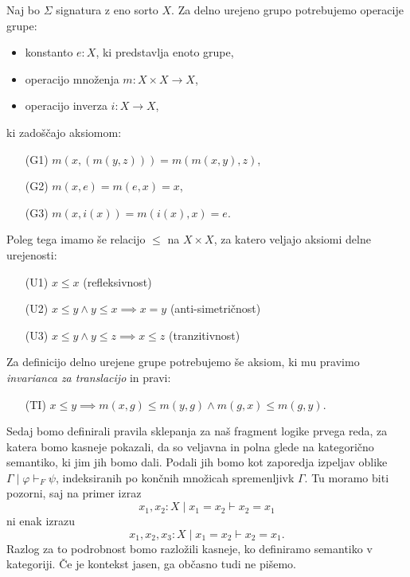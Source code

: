 \documentclass[../kategoricna_logika.tex]{subfiles}
\begin{document}
\begin{primer}\label{primer:delno-urejene-grupe}
  Naj bo $\Sigma$ signatura z eno sorto $X$. Za delno
  urejeno grupo potrebujemo operacije grupe:
  \begin{itemize}
  \item konstanto $e : X$, ki predstavlja enoto grupe,
  \item operacijo množenja $m : X \times X \to X$,
  \item operacijo inverza $i : X \to X$,
  \end{itemize}
  ki zadoščajo aksiomom:
  \begin{itemize}
  \item[(G1)] $m(x,(m(y,z))) = m(m(x,y), z)$,
  \item[(G2)] $m(x,e) = m(e,x) = x$,
  \item[(G3)] $m(x,i(x)) = m(i(x), x) = e$.
  \end{itemize}
  Poleg tega imamo še relacijo $\leq$ na $X \times X$, za katero
  veljajo aksiomi delne urejenosti:
  \begin{itemize}
  \item[(U1)] $x \leq x$ (refleksivnost)
  \item[(U2)] $x \leq y \wedge y \leq x \implies x = y$
    (anti-simetričnost)
  \item[(U3)] $x \leq y \wedge y \leq z \implies x \leq z$
    (tranzitivnost)
  \end{itemize}
  Za definicijo delno urejene grupe potrebujemo še aksiom, ki mu
  pravimo {\emph{invarianca za translacijo}} in pravi:
  \begin{itemize}
  \item[(TI)]
    $x \leq y \implies m(x, g) \leq m(y, g) \wedge m(g,x) \leq
    m(g,y)$.
  \end{itemize}
\end{primer}

Sedaj bomo definirali pravila sklepanja za naš fragment logike prvega
reda, za katera bomo kasneje pokazali, da so veljavna in polna glede
na kategorično semantiko, ki jim jih bomo dali.  Podali jih bomo kot
zaporedja izpeljav oblike $\Gamma \mid \varphi \vdash_F \psi$,
indeksiranih po končnih množicah spremenljivk $\Gamma$.
Tu moramo biti pozorni, saj na primer izraz
\[x_1,x_2:X \mid x_1 = x_2 \vdash x_2 = x_1\] ni enak izrazu
\[x_1,x_2,x_3:X \mid x_1 = x_2 \vdash x_2 = x_1.\] Razlog za to
podrobnost bomo razložili kasneje, ko definiramo semantiko v
kategoriji. Če je kontekst jasen, ga občasno tudi ne pišemo.
\end{document}
